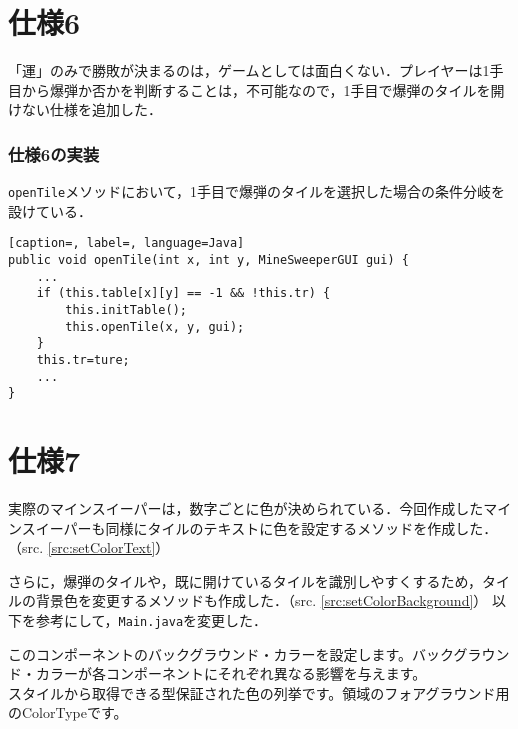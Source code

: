 \documentclass[a4j,11pt]{jsarticle}
\newcommand{\srcref}[1]{src. \ref{#1}}
\begin{document}
\section*{仕様6}
\setcounter{section}{6}
\setcounter{subsection}{0}
「運」のみで勝敗が決まるのは，ゲームとしては面白くない．プレイヤーは1手目から爆弾か否かを判断することは，不可能なので，1手目で爆弾のタイルを開けない仕様を追加した．
\subsubsection*{仕様6の実装}
\verb|openTile|メソッドにおいて，1手目で爆弾のタイルを選択した場合の条件分岐を設けている．
\begin{lstlisting}[caption=, label=, language=Java]
public void openTile(int x, int y, MineSweeperGUI gui) {
    ...
    if (this.table[x][y] == -1 && !this.tr) {
        this.initTable();
        this.openTile(x, y, gui);
    }
    this.tr=ture;
    ...
}
\end{lstlisting}
\section*{仕様7}
\setcounter{section}{7}
\setcounter{subsection}{0}
実際のマインスイーパーは，数字ごとに色が決められている．今回作成したマインスイーパーも同様にタイルのテキストに色を設定するメソッドを作成した．（\srcref{src:setColorText}）\par
さらに，爆弾のタイルや，既に開けているタイルを識別しやすくするため，タイルの背景色を変更するメソッドも作成した．（\srcref{src:setColorBackground}）
以下を参考にして，\verb|Main.java|を変更した．
\begin{screen}
    このコンポーネントのバックグラウンド・カラーを設定します。バックグラウンド・カラーが各コンポーネントにそれぞれ異なる影響を与えます。\cite{label3}\\
    スタイルから取得できる型保証された色の列挙です。領域のフォアグラウンド用のColorTypeです。\cite{label4}
\end{screen}
\end{document}
